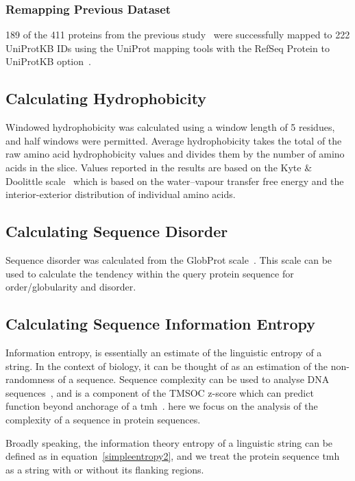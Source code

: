 \subsubsection{Remapping Previous Dataset}
189 of the 411 proteins from the previous study~\cite{Kalbfleisch2007} were successfully mapped to 222 UniProtKB IDs using the UniProt mapping tools with the RefSeq Protein to UniProtKB option~\cite{TheUniProtConsortium2014}.

\subsection{Calculating Hydrophobicity}
Windowed hydrophobicity was calculated using a window length of 5 residues, and half windows were permitted.
Average hydrophobicity takes the total of the raw amino acid hydrophobicity values and divides them by the number of amino acids in the slice.
Values reported in the results are based on the Kyte \& Doolittle scale~\cite{Kyte1982} which is based on the water\---vapour transfer free energy and the interior-exterior distribution of individual amino acids.

\subsection{Calculating Sequence Disorder}

Sequence disorder was calculated from the GlobProt scale~\cite{Linding2003}.
This scale can be used to calculate the tendency within the query protein sequence for order/globularity and disorder.

\subsection{Calculating Sequence Information Entropy}
Information entropy, is essentially an estimate of the linguistic entropy of a string.
In the context of biology, it can be thought of as an estimation of the non-randomness of a sequence.
Sequence complexity can be used to analyse DNA sequences~\cite{Pinho2013, Oliver1993, Troyanskaya2002}, and is a component of the TMSOC z-score which can predict function beyond anchorage of a \gls{tmh}~\cite{Wong2011, Wong2012, Baker2017}.
here we focus on the analysis of the complexity of a sequence in protein sequences.

Broadly speaking, the information theory entropy of a linguistic string can be defined as in equation~\ref{simpleentropy2}, and we treat the protein sequence \gls{tmh} as a string with or without its flanking regions.

